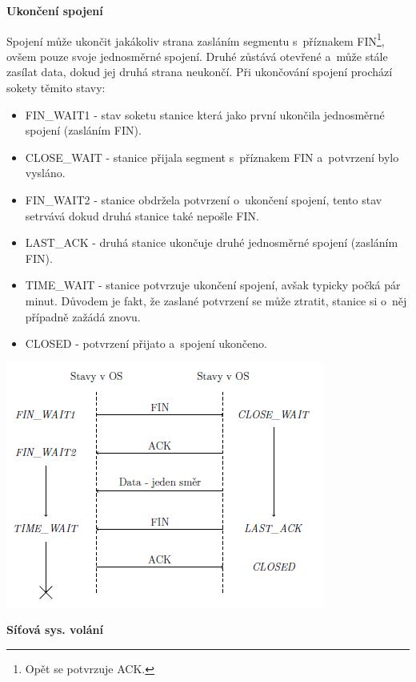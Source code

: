 \vspace{0,5cm}
\textbf{Ukončení spojení}

Spojení může ukončit jakákoliv strana zasláním segmentu s~příznakem FIN\footnote{Opět se potvrzuje ACK.}, ovšem pouze svoje jednosměrné spojení. Druhé zůstává otevřené a~může stále zasílat data, dokud jej druhá strana neukončí. Při ukončování spojení prochází sokety těmito stavy:
\begin{itemize}
    \item FIN\_WAIT1 - stav soketu stanice která jako první ukončila jednosměrné spojení (zasláním FIN).
    \item CLOSE\_WAIT - stanice přijala segment s~příznakem FIN a~potvrzení bylo vysláno. 
    \item FIN\_WAIT2 - stanice obdržela potvrzení o~ukončení spojení, tento stav setrvává dokud druhá stanice také nepošle FIN. 
    \item LAST\_ACK - druhá stanice ukončuje druhé jednosměrné spojení (zasláním FIN).
    \item TIME\_WAIT - stanice potvrzuje ukončení spojení, avšak typicky počká pár minut. Důvodem je fakt, že zaslané potvrzení se může ztratit, stanice si o~něj případně zažádá znovu. 
    \item CLOSED - potvrzení přijato a~spojení ukončeno.
\end{itemize}

\begin{center}
    \includegraphics[scale=1]{images/network_tcp_close.png}
\end{center}

\begin{Large}
    \vspace{0,5cm}
    \textbf{Síťová sys. volání}
\end{Large}

